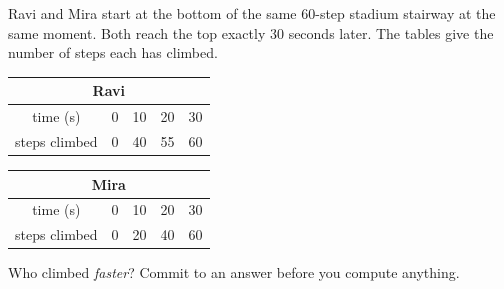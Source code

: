\documentclass[10pt]{article}
\begin{document}
\vspace{0.1in}

\boxguard[22]
\begin{hookbox}
Ravi and Mira start at the bottom of the same 60-step stadium stairway at the
same moment. Both reach the top exactly 30 seconds later. The tables give the
number of steps each has climbed.

\smallskip
\begin{center}
\renewcommand{\arraystretch}{1.4}
\begin{tabular}{|c|c|c|c|c|}
\hline
\multicolumn{5}{|c|}{\textbf{Ravi}} \\
\hline
time (s) & 0 & 10 & 20 & 30 \\
\hline
steps climbed & 0 & 40 & 55 & 60 \\
\hline
\end{tabular}
\hspace{0.5cm}
\begin{tabular}{|c|c|c|c|c|}
\hline
\multicolumn{5}{|c|}{\textbf{Mira}} \\
\hline
time (s) & 0 & 10 & 20 & 30 \\
\hline
steps climbed & 0 & 20 & 40 & 60 \\
\hline
\end{tabular}
\end{center}
\smallskip

Who climbed \textit{faster}? Commit to an answer before you compute anything.
\end{hookbox}

\vspace{0.1in}
\end{document}
